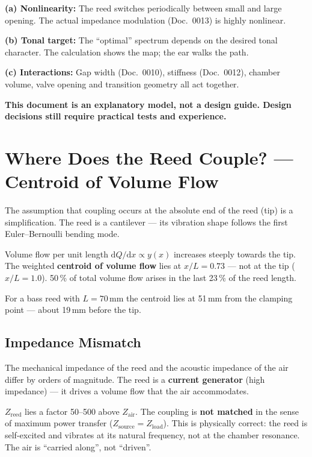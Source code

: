 \documentclass[11pt,a4paper]{article}
\begin{document}
\textbf{(a) Nonlinearity:} The reed switches periodically between small and large opening. The actual impedance modulation (Doc.~0013) is highly nonlinear.

\textbf{(b) Tonal target:} The ``optimal'' spectrum depends on the desired tonal character. The calculation shows the map; the ear walks the path.

\textbf{(c) Interactions:} Gap width (Doc.~0010), stiffness (Doc.~0012), chamber volume, valve opening and transition geometry all act together.

\begin{tcolorbox}[colframe=red!60!black, colback=red!5!white]
\textbf{This document is an explanatory model, not a design guide. Design decisions still require practical tests and experience.}
\end{tcolorbox}

\section{Where Does the Reed Couple? --- Centroid of Volume Flow}

The assumption that coupling occurs at the absolute end of the reed (tip) is a simplification. The reed is a cantilever --- its vibration shape follows the first Euler--Bernoulli bending mode.

Volume flow per unit length $\mathrm{d}Q/\mathrm{d}x \propto y(x)$ increases steeply towards the tip. The weighted \textbf{centroid of volume flow} lies at $x/L = 0{.}73$ --- not at the tip ($x/L = 1{.}0$). 50\,\% of total volume flow arises in the last 23\,\% of the reed length.

For a bass reed with $L = 70$\,mm the centroid lies at 51\,mm from the clamping point --- about 19\,mm before the tip.

\subsection{Impedance Mismatch}

The mechanical impedance of the reed and the acoustic impedance of the air differ by orders of magnitude. The reed is a \textbf{current generator} (high impedance) --- it drives a volume flow that the air accommodates.

$Z_\mathrm{reed}$ lies a factor 50--500 above $Z_\mathrm{air}$. The coupling is \textbf{not matched} in the sense of maximum power transfer ($Z_\mathrm{source} = Z_\mathrm{load}$). This is physically correct: the reed is self-excited and vibrates at its natural frequency, not at the chamber resonance. The air is ``carried along'', not ``driven''.
\end{document}
